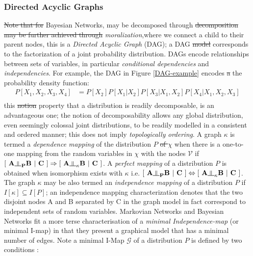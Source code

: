 \documentclass[7pt]{article}
\newcommand{\inperp}{\rotatebox[origin=c]{90}{$\models$}}
\begin{document}
\subsubsection{Directed Acyclic Graphs}
\st{Note that for} Bayesian Networks, may be decomposed through  \st{decomposition may be further achieved through} \emph{moralization},where  we connect a child to their parent nodes, this is a \emph{Directed Acyclic Graph} (DAG); a DAG \st{model} corresponds to the  factorization of a joint probability distribution. DAGs encode
relationships between sets of variables, in particular \emph{conditional
	dependencies} and \emph{independencies}. For example, the DAG in Figure \ref{DAG-example} encodes \st{a} the probability density function:
\begin{equation}
\begin{split}
P[X_1,X_2,X_3,X_4] & =  P[X_2]P[X_1|X_2]P[X_3|X_1,X_2]P[X_4|X_1,X_2,{X_3}] \\
\end{split}
\end{equation}
this \st{notion} property that a distribution is readily decomposable, is an advantageous one; the notion of decomposability allows any global distribution, even seemingly colossal joint distributions, to be readily modelled in a consistent and ordered manner; this does not imply \emph{topologically ordering}.  A graph $\kappa$ is termed a \emph{dependence mapping} of the distribution $P$ \st{of $\chi$} when there is a one-to-one mapping from the random variables in $\chi$ with the nodes $\mathcal{V}$ if $[\hspace{0.05in} \mathbf{A \inperp_P B \hspace{0.05in} \vert \hspace{0.05in} C \hspace{0.05in}}] \Rightarrow [\hspace{0.05in} \mathbf{A \inperp_\kappa B \hspace{0.05in} \vert \hspace{0.05in} C \hspace{0.05in}}]$. A \emph{perfect mapping} of a distribution $P$ is obtained when isomorphism exists with $\kappa$ i.e. $[\hspace{0.05in} \mathbf{A \inperp_P B \hspace{0.05in} \vert \hspace{0.05in} C \hspace{0.05in}}] \Leftrightarrow [\hspace{0.05in} \mathbf{A \inperp_\kappa B \hspace{0.05in} \vert \hspace{0.05in} C \hspace{0.05in}}]$. The graph $\kappa$ may be also  termed an \emph{independence mapping} of a distribution $P$ if $I [\kappa] \subseteq I[P]$; an independence mapping characterization denotes that the two disjoint nodes A and B separated by C in the graph model in fact correspond to independent sets of random variables. Markovian Networks and Bayesian Networks fit a more terse characterisation of a \emph{minimal Independence-map} (or minimal I-map) in that they present a graphical model that has a minimal number of edges. Note a minimal I-Map $\mathcal{G}$ of a distribution $P$ is defined by two conditions \cite{pearl1988probabilistic}: 
\end{document}
